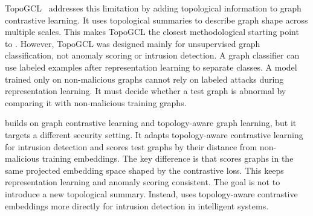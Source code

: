 TopoGCL~\cite{chen2024topogcl} addresses this limitation by adding topological information to graph contrastive learning. It uses topological summaries to describe graph shape across multiple scales. This makes TopoGCL the closest methodological starting point to \sysname. However, TopoGCL was designed mainly for unsupervised graph classification, not anomaly scoring or intrusion detection. A graph classifier can use labeled examples after representation learning to separate classes. A model trained only on non-malicious graphs cannot rely on labeled attacks during representation learning. It must decide whether a test graph is abnormal by comparing it with non-malicious training graphs.

\sysname builds on graph contrastive learning and topology-aware graph learning, but it targets a different security setting. It adapts topology-aware contrastive learning for intrusion detection and scores test graphs by their distance from non-malicious training embeddings. The key difference is that \sysname scores graphs in the same projected embedding space shaped by the contrastive loss. This keeps representation learning and anomaly scoring consistent. The goal is not to introduce a new topological summary. Instead, \sysname uses topology-aware contrastive embeddings more directly for intrusion detection in intelligent systems.
